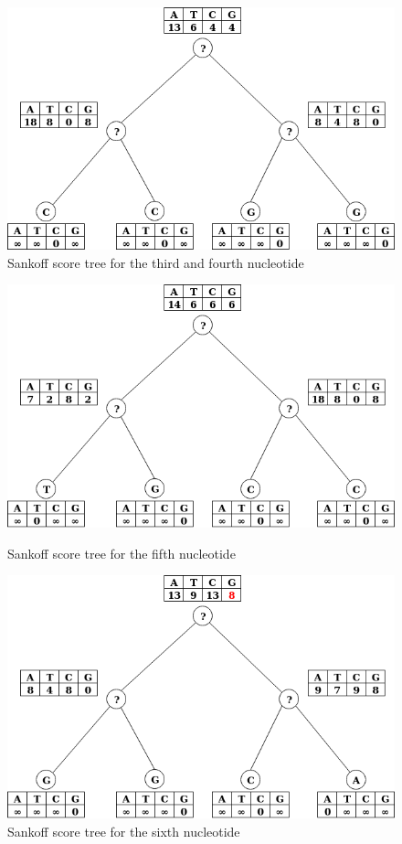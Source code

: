 \documentclass[]{article}
\begin{document}
\begin{figure}[h!]
	\includegraphics*[width = \linewidth]{image/tree_3-4.png}
	\caption{Sankoff score tree for the third and fourth nucleotide  }
\end{figure}

\begin{figure}[h!]
	\includegraphics*[width = \linewidth]{image/tree_5.png}\\
	\caption{Sankoff score tree for the fifth nucleotide  }
\end{figure}

\begin{figure}[h!]
	\includegraphics*[width = \linewidth]{image/tree_6.png}
	\caption{Sankoff score tree for the sixth nucleotide  }
\end{figure}
\end{document}
